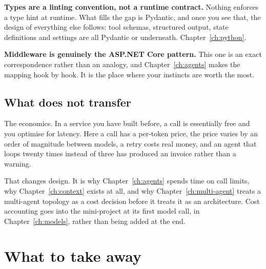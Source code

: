 \textbf{Types are a linting convention, not a runtime contract.} Nothing enforces
a type hint at runtime. What fills the gap is Pydantic, and once you see that,
the design of everything else follows: tool schemas, structured output, state
definitions and settings are all Pydantic or  underneath.
Chapter~\ref{ch:python}.

\textbf{Middleware is genuinely the ASP.NET Core pattern.} This one is an exact
correspondence rather than an analogy, and Chapter~\ref{ch:agents} makes the
mapping hook by hook. It is the place where your instincts are worth the most.

\subsection{What does not transfer}

The economics. In a service you have built before, a call is essentially free and
you optimise for latency. Here a call has a per-token price, the price varies by
an order of magnitude between models, a retry costs real money, and an agent that
loops twenty times instead of three has produced an invoice rather than a
warning.

That changes design. It is why Chapter~\ref{ch:agents} spends time on call
limits, why Chapter~\ref{ch:context} exists at all, and why
Chapter~\ref{ch:multi-agent} treats a multi-agent topology as a cost decision
before it treats it as an architecture. Cost accounting goes into the
mini-project at its first model call, in Chapter~\ref{ch:models}, rather than
being added at the end.

\section{What to take away}
\label{sec:ch1-summary}


